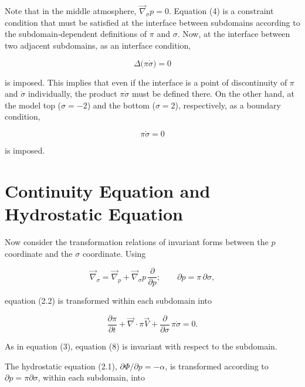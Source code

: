 \documentclass[12pt,openany]{book}
\begin{document}
Note that in the middle atmosphere,
$\vec{\nabla}_{\sigma} p = 0$.
Equation (4) is a constraint condition that must be satisfied at the
interface between subdomains according to the subdomain‑dependent
definitions of $\pi$ and $\sigma$.
Now, at the interface between two adjacent subdomains, as an interface
condition,

\begin{equation}
\Delta \bigl( \pi \dot{\sigma} \bigr) = 0
\tag{3.5}
\label{3.5}
\end{equation}

is imposed.
This implies that even if the interface is a point of discontinuity
of $\pi$ and $\dot{\sigma}$ individually, the product $\pi \dot{\sigma}$
must be defined there.
On the other hand, at the model top ($\sigma = -2$) and the bottom
($\sigma = 2$), respectively, as a boundary condition,

\begin{equation}
\pi \dot{\sigma} = 0
\tag{3.6}
\label{3.6}
\end{equation}

is imposed.

\section{Continuity Equation and Hydrostatic Equation}

Now consider the transformation relations of invariant forms between the
$p$ coordinate and the $\sigma$ coordinate.
Using

\begin{equation}
\vec{\nabla}_{\sigma}
=
\vec{\nabla}_{p}
+
\vec{\nabla}_{\sigma} p \,
\frac{\partial}{\partial p};
\qquad
\partial p = \pi \, \partial \sigma ,
\tag{3.7}
\label{3.7}
\end{equation}

equation (2.2) is transformed within each subdomain into

\begin{equation}
\frac{\partial \pi}{\partial t}
+
\vec{\nabla} \cdot \pi \vec{V}
+
\frac{\partial}{\partial \sigma}
\,
\pi \dot{\sigma}
=
0 .
\tag{3.8}
\label{3.8}
\end{equation}

As in equation (3), equation (8) is invariant with respect to the
subdomain.

The hydrostatic equation (2.1),
$\partial \Phi / \partial p = - \alpha$,
is transformed according to $\partial p = \pi \partial \sigma$,
within each subdomain, into
\end{document}
